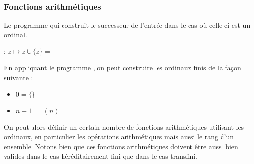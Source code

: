 \documentclass[a4paper, 11pt]{article}
\begin{document}
\subsubsection{Fonctions arithmétiques}

Le programme qui construit le successeur de l'entrée dans le cas où celle-ci est un ordinal.
    
: $z \mapsto z \cup\{z\} =$  

En appliquant le programme , on peut construire les ordinaux 
finis de la façon suivante : 
\begin{itemize}
    \item $0 = \{\}$
    \item $n + 1 = $  $(n)$
\end{itemize}

On peut alors définir un certain nombre de fonctions arithmétiques
utilisant les ordinaux, en particulier les opérations arithmétiques mais
aussi le rang d'un ensemble. Notons bien que ces fonctions arithmétiques doivent
être aussi bien valides dans le cas héréditairement fini que dans le cas transfini.


\def\predecesseur{\mbox{\scriptsize\bfseries P}}

\def\add{\mbox{\scriptsize\bfseries +}}
\def\sub{\mbox{\scriptsize\bfseries -}}
\def\mult{\mbox{\scriptsize\bfseries $\times$}}
\def\div{\mbox{\scriptsize\bfseries /}}
\def\pow{\mbox{\scriptsize\bfseries $\alpha^\beta$}}
\def\log{\mbox{\scriptsize\bfseries log}}
\end{document}
